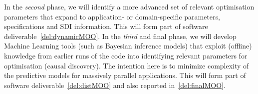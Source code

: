 \begin{Workpackage}{\thewpno}
\begin{Task}
%
%
%
In the \emph{second} phase, we will identify a more advanced set of relevant optimisation parameters that expand to application- or domain-specific parameters, specifications and SDI information. This will form part of software deliverable~\ref{del:dynamicMOO}.
%
In the \emph{third} and final phase, we will develop Machine Learning tools 
(such as Bayesian inference models) that exploit (offline) knowledge from earlier 
runs of the code into identifying relevant parameters for optimisation (causal discovery). The intention here is to minimize complexity of the predictive models for massively parallel applications. This will form part of software deliverable~\ref{del:distMOO} and also reported in~\ref{del:finalMOO}.






\end{Task}
\end{Workpackage}
